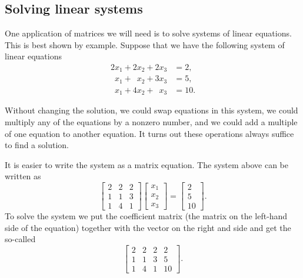 \subsection{Solving linear systems}

One application of matrices we will need is to solve systems of
linear equations.  This is best shown by example.
Suppose that we have the following system of linear equations
\begin{align*}
          2 x_1 +           2 x_2 +           2 x_3 & = 2 , \\
\phantom{9} x_1 + \phantom{9} x_2 +           3 x_3 & = 5 , \\
\phantom{9} x_1 +           4 x_2 + \phantom{9} x_3 & = 10 .
\end{align*}

Without changing the solution,
we could swap equations in this system,
we could multiply any of the equations by a nonzero number, and
we could add a multiple of one equation to another equation.
It turns out these operations always suffice to find a solution.

It is easier to write the system as a matrix equation.
The system above can be
written as
\begin{equation*}
\begin{bmatrix}
2 & 2 & 2 \\
1 & 1 & 3 \\
1 & 4 & 1 
\end{bmatrix}
\begin{bmatrix}
x_1 \\
x_2 \\
x_3
\end{bmatrix} 
=
\begin{bmatrix}
2 \\
5 \\
10
\end{bmatrix} .
\end{equation*}
To solve the system we put the coefficient matrix (the matrix on the
left-hand side of the equation) together with the vector on the right and side
and get the
so-called
\emph{}
\begin{equation*}
\left[
\begin{array}{ccc|c}
2 & 2 & 2 & 2 \\
1 & 1 & 3 & 5 \\
1 & 4 & 1 & 10
\end{array}
\right] .
\end{equation*}

